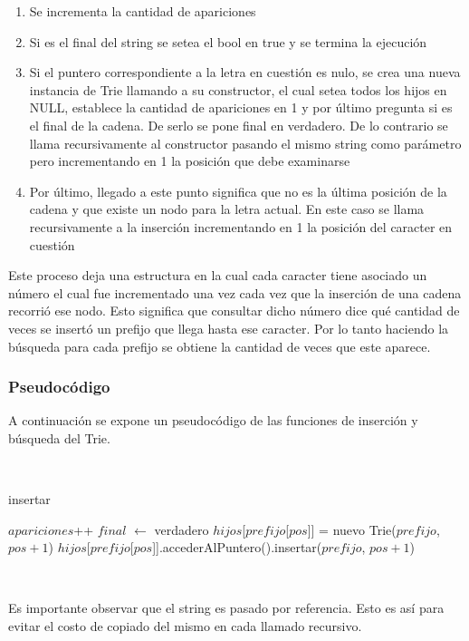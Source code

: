\begin{enumerate}
\item Se incrementa la cantidad de apariciones
\item Si es el final del string se setea el bool en true y se termina la
ejecución
\item Si el puntero correspondiente a la letra en cuestión es nulo, se crea
una nueva instancia de Trie llamando a su constructor, el cual setea todos los
hijos en NULL, establece la cantidad de apariciones en 1 y por último pregunta
si es el final de la cadena. De serlo se pone final en verdadero. De lo
contrario se llama recursivamente al constructor pasando el mismo string como
parámetro pero incrementando en 1 la posición que debe examinarse
\item Por último, llegado a este punto significa que no es la última posición
de la cadena y que existe un nodo para la letra actual. En este caso se llama
recursivamente a la inserción incrementando en 1 la posición del caracter en
cuestión
\end{enumerate}

Este proceso deja una estructura en la cual cada caracter tiene asociado un
número el cual fue incrementado una vez cada vez que la inserción de una
cadena recorrió ese nodo. Esto significa que consultar dicho número dice
qué cantidad de veces se insertó un prefijo que llega hasta ese caracter.
Por lo tanto haciendo la búsqueda para cada prefijo se obtiene la cantidad de
veces que este aparece.

\subsubsection{Pseudocódigo}

A continuación se expone un pseudocódigo de las funciones de inserción y
búsqueda del Trie.

~

\begin{algorithm}[H]
	\caption{insertar}

	$apariciones$++ \;
	 {
		$final$ $\gets$ verdadero \;
	} {
		 {
			$hijos$[$prefijo$[$pos$]] = nuevo Trie($prefijo$, $pos + 1$) \;
		} {
			$hijos$[$prefijo$[$pos$]].accederAlPuntero().insertar($prefijo$, $pos + 1$) \;
		}
	}
\end{algorithm}

~

Es importante observar que el string es pasado por referencia. Esto es así
para evitar el costo de copiado del mismo en cada llamado recursivo.

